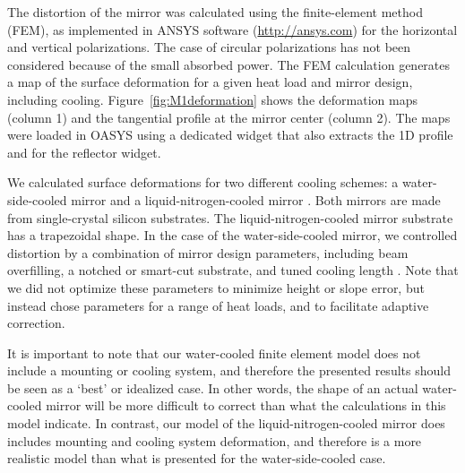 \documentclass{iucr}
\begin{document}
The distortion of the mirror was calculated using the finite-element method (FEM), as implemented in ANSYS software (\url{http://ansys.com}) for the horizontal and vertical polarizations. The case of circular polarizations has not been considered because of the small absorbed power. The FEM calculation generates a map of the surface deformation for a given heat load and mirror design, including cooling. Figure~\ref{fig:M1deformation} shows the deformation maps (column 1) and the tangential profile at the mirror center (column 2). The maps were loaded in OASYS using a dedicated widget that also extracts the 1D profile and for the reflector widget.

We calculated surface deformations for two different cooling schemes: a water-side-cooled mirror and a liquid-nitrogen-cooled mirror \cite{cuttler}. Both mirrors are made from single-crystal silicon substrates. 
The liquid-nitrogen-cooled mirror substrate has a trapezoidal shape. In the case of the water-side-cooled mirror, we controlled distortion by a combination of mirror design parameters, including beam overfilling, a notched or smart-cut substrate, and tuned cooling length \cite{Zhang}. Note that we did not optimize these parameters to minimize height or slope error, but instead chose parameters for a range of heat loads, and to facilitate adaptive correction.

It is important to note that our water-cooled finite element model does not include a mounting or cooling system, and therefore the presented results should be seen as a `best' or idealized case.  In other words, the shape of an actual water-cooled mirror will be more difficult to correct than what the calculations in this model indicate. In contrast, our model of the liquid-nitrogen-cooled mirror does includes mounting and cooling system deformation, and therefore is a more realistic model than what is presented for the water-side-cooled case.
\end{document}

